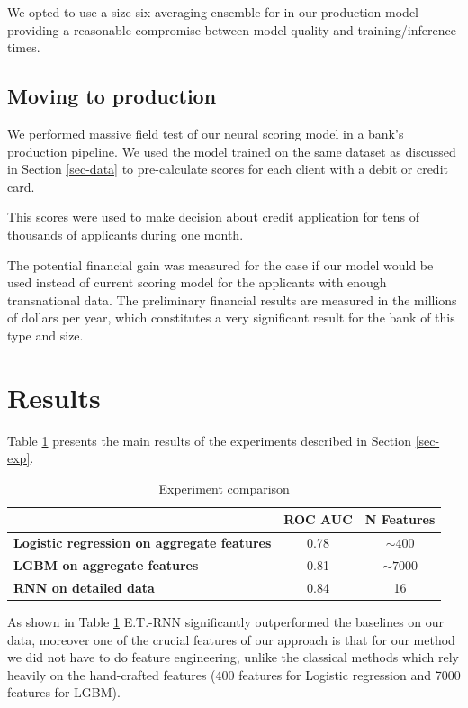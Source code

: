 \documentclass[sigconf]{acmart}
\begin{document}
We opted to use a size six averaging ensemble for in our production model providing a reasonable compromise between model quality and training/inference times. 

\subsection{Moving to production}

We performed massive field test of our neural scoring model in a bank's production pipeline. We used the model trained on the same dataset as discussed in Section \ref{sec-data} to pre-calculate scores for each client with a debit or credit card.

This scores were used to make decision about credit application for tens of thousands of applicants during one month.

The potential financial gain was measured for the case if our model would be used instead of current scoring model for the applicants with enough transnational data. The preliminary financial results are measured in the millions of dollars per year, which constitutes a very significant result for the bank of this type and size.

\section{Results}

Table \ref{tab-res} presents the main results of the experiments described in Section \ref{sec-exp}.

\begin{table}[ht]
\caption{Experiment comparison}
\begin{tabular}{ | p{12em} | c | c | }
\hline
& \textbf{ROC AUC} & \textbf{N Features} \\
\hline
\textbf{Logistic regression on aggregate features} & 0.78 & $\sim400$ \\
\textbf{LGBM on aggregate features} & 0.81 & $\sim7000$ \\
\textbf{RNN on detailed data} & 0.84 & 16 \\
\hline
\end{tabular}
\label{tab-res}
\end{table}

As shown in Table \ref{tab-res} E.T.-RNN significantly outperformed the baselines on our data, moreover one of the crucial features of our approach is that for our method we did not have to do feature engineering, unlike the classical methods which rely heavily on the hand-crafted features (400 features for Logistic regression and 7000 features for LGBM).
\end{document}
